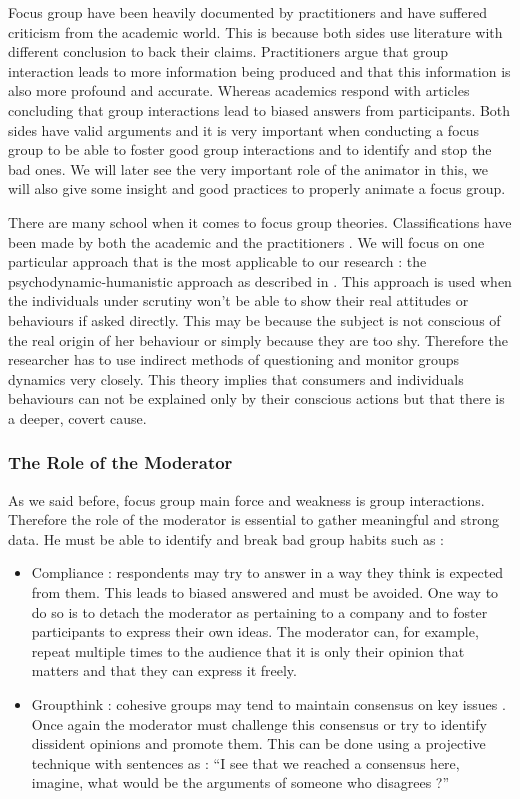 \documentclass[10pt]{report}
\begin{document}
Focus group have been heavily documented by practitioners and have suffered criticism from the academic world. This is because both sides use literature with different conclusion to back their claims. Practitioners argue that group interaction leads to more information being produced and that this information is also more profound and accurate. Whereas academics respond with articles concluding that group interactions lead to biased answers from participants. Both sides have valid arguments and it is very important when conducting a focus group to be able to foster good group interactions and to identify and stop the bad ones. We will later see the very important role of the animator in this, we will also give some insight and good practices to properly animate a focus group.

There are many school when it comes to focus group theories. Classifications have been made by both the academic \autocite{Calder1977} and the practitioners \autocite{Imms2002}. We will focus on one particular approach that is the most applicable to our research : the psychodynamic-humanistic approach as described in \cite{belk2007handbook}. This approach is used when the individuals under scrutiny won't be able to show their real attitudes or behaviours if asked directly. This may be because the subject is not conscious of the real origin of her behaviour or simply because they are too shy. Therefore the researcher has to use indirect methods of questioning and monitor groups dynamics very closely. This theory implies that consumers and individuals behaviours can not be explained only by their conscious actions but that there is a deeper, covert cause.

\subsubsection{The Role of the Moderator}

As we said before, focus group main force and weakness is group interactions. Therefore the role of the moderator is essential to gather meaningful and strong data. He must be able to identify and break bad group habits such as :
\begin{itemize}
\item Compliance : respondents may try to answer in a way they think is expected from them. This leads to biased answered and must be avoided. One way to do so is to detach the moderator as pertaining to a company and to foster participants to express their own ideas. The moderator can, for example, repeat multiple times to the audience that it is only their opinion that matters and that they can express it freely.
\item Groupthink : cohesive groups may tend to maintain consensus on key issues \autocite{Janis1982}. Once again the moderator must challenge this consensus or try to identify dissident opinions and promote them. This can be done using a projective technique with sentences as : \enquote{I see that we reached a consensus here, imagine, what would be the arguments of someone who disagrees ?}
\end{itemize}
\end{document}
